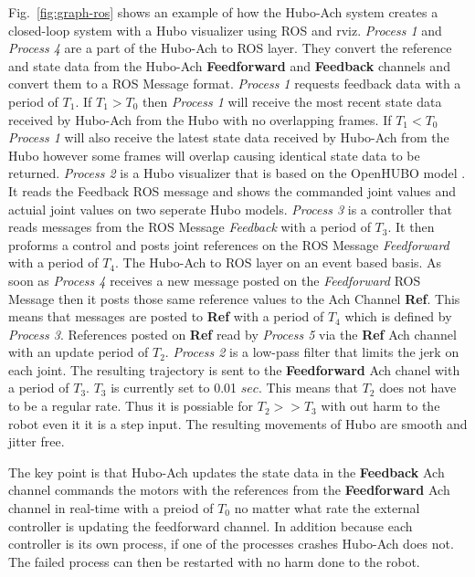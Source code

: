 Fig.~\ref{fig:graph-ros} shows an example of how the Hubo-Ach system creates a closed-loop system with a Hubo visualizer using ROS and rviz.
\textit{Process 1} and \textit{Process 4} are a part of the Hubo-Ach to ROS layer.
They convert the reference and state data from the Hubo-Ach \textbf{Feedforward} and \textbf{Feedback} channels and convert them to a ROS Message format.
\textit{Process 1} requests feedback data with a period of $T_1$.
If $T_1>T_0$ then \textit{Process 1} will receive the most recent state data received by Hubo-Ach from the Hubo with no overlapping frames.
If $T_1<T_0$ \textit{Process 1} will also receive the latest state data received by Hubo-Ach from the Hubo however some frames will overlap causing identical state data to be returned.
\textit{Process 2} is a Hubo visualizer that is based on the OpenHUBO model \cite{jaemiHuboSRM}.
It reads the Feedback ROS message and shows the commanded joint values and actuial joint values on two seperate Hubo models.
\textit{Process 3} is a controller that reads messages from the ROS Message \textit{Feedback} with a period of $T_3$.
It then proforms a control and posts joint references on the ROS Message \textit{Feedforward} with a period of $T_4$.
The Hubo-Ach to ROS layer on an event based basis. 
As soon as \textit{Process 4} receives a new message posted on the \textit{Feedforward} ROS Message then it posts those same reference values to the Ach Channel \textbf{Ref}.
This means that messages are posted to \textbf{Ref} with a period of $T_4$ which is defined by \textit{Process 3}.
References posted on \textbf{Ref} read by \textit{Process 5} via the \textbf{Ref} Ach channel with an update period of $T_2$.
\textit{Process 2} is a low-pass filter that limits the jerk on each joint.
The resulting trajectory is sent to the \textbf{Feedforward} Ach chanel with a period of $T_3$.
$T_3$ is currently set to 0.01 $sec$.
This means that $T_2$ does not have to be a regular rate.
Thus it is possiable for $T_2>>T_3$ with out harm to the robot even it it is a step input.
The resulting movements of Hubo are smooth and jitter free.

The key point is that Hubo-Ach updates the state data in the \textbf{Feedback} Ach channel commands the motors with the references from the \textbf{Feedforward} Ach channel in real-time with a preiod of $T_0$ no matter what rate the external controller is updating the feedforward channel.  
In addition because each controller is its own process, if one of the processes crashes Hubo-Ach does not.
The failed process can then be restarted with no harm done to the robot.

